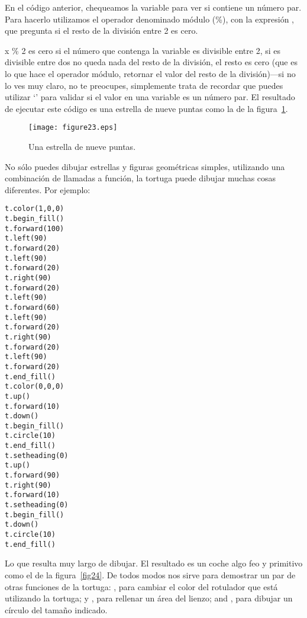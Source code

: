 En el código anterior, chequeamos la variable  para ver si contiene un número par.  Para hacerlo utilizamos el operador denominado módulo (\%), con la expresión , que pregunta si el resto de la división entre 2 es cero.
\par
x \% 2 es cero si el número que contenga la variable  es divisible entre 2, si es divisible entre dos no queda nada del resto de la división, el resto es cero (que es lo que hace el operador módulo, retornar el valor del resto de la división)---si no lo ves muy claro, no te preocupes, simplemente trata de recordar que puedes utilizar `' para validar si el valor en una variable es un número par.  El resultado de ejecutar este código es una estrella de nueve puntas como la de la figura~\ref{fig23}.

\begin{figure}
\begin{center}
\texttt{[image: figure23.eps]}
\end{center}
\caption{Una estrella de nueve puntas.}\label{fig23}
\end{figure}

No sólo puedes dibujar estrellas y figuras geométricas simples, utilizando una combinación de llamadas a función, la tortuga puede dibujar muchas cosas diferentes. Por ejemplo:

\begin{listing}
\begin{verbatim}
t.color(1,0,0)
t.begin_fill()
t.forward(100)
t.left(90)
t.forward(20)
t.left(90)
t.forward(20)
t.right(90)
t.forward(20)
t.left(90)
t.forward(60)
t.left(90)
t.forward(20)
t.right(90)
t.forward(20)
t.left(90)
t.forward(20)
t.end_fill()
t.color(0,0,0)
t.up()
t.forward(10)
t.down()
t.begin_fill()
t.circle(10)
t.end_fill()
t.setheading(0)
t.up()
t.forward(90)
t.right(90)
t.forward(10)
t.setheading(0)
t.begin_fill()
t.down()
t.circle(10)
t.end_fill()
\end{verbatim}
\end{listing}

\noindent
Lo que resulta muy largo de dibujar. El resultado es un coche algo feo y primitivo como el de la figura~\ref{fig24}. De todos modos nos sirve para demostrar un par de otras funciones de la tortuga:  , para cambiar el color del rotulador que está utilizando la tortuga;  y , para rellenar un área del lienzo; and , para dibujar un círculo del tamaño indicado.

